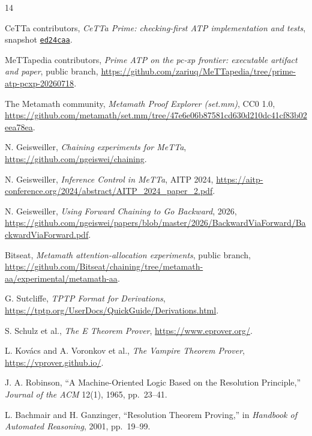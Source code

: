 \documentclass[10pt]{article}
\begin{document}
\begin{thebibliography}{14}

CeTTa contributors,
\emph{CeTTa Prime: checking-first ATP implementation and tests},
snapshot
\href{https://github.com/zariuq/CeTTa/tree/ed24caaa06ddc9e56afc06a33aea5fd6c8b046ea}
{\texttt{ed24caa}}.

MeTTapedia contributors,
\emph{Prime ATP on the pc-xp frontier: executable artifact and paper},
public branch,
\url{https://github.com/zariuq/MeTTapedia/tree/prime-atp-pcxp-20260718}.

The Metamath community,
\emph{Metamath Proof Explorer (set.mm)}, CC0 1.0,
\url{https://github.com/metamath/set.mm/tree/47e6e06b87581cd630d210dc41cf83b02eea78ea}.

N. Geisweiller,
\emph{Chaining experiments for MeTTa},
\url{https://github.com/ngeiswei/chaining}.

N. Geisweiller,
\emph{Inference Control in MeTTa}, AITP 2024,
\url{https://aitp-conference.org/2024/abstract/AITP_2024_paper_2.pdf}.

N. Geisweiller,
\emph{Using Forward Chaining to Go Backward}, 2026,
\url{https://github.com/ngeiswei/papers/blob/master/2026/BackwardViaForward/BackwardViaForward.pdf}.

Bitseat,
\emph{Metamath attention-allocation experiments}, public branch,
\url{https://github.com/Bitseat/chaining/tree/metamath-aa/experimental/metamath-aa}.

G. Sutcliffe,
\emph{TPTP Format for Derivations},
\url{https://tptp.org/UserDocs/QuickGuide/Derivations.html}.

S. Schulz et al.,
\emph{The E Theorem Prover},
\url{https://www.eprover.org/}.

L. Kov\'acs and A. Voronkov et al.,
\emph{The Vampire Theorem Prover},
\url{https://vprover.github.io/}.

J. A. Robinson,
``A Machine-Oriented Logic Based on the Resolution Principle,''
\emph{Journal of the ACM} 12(1), 1965, pp.~23--41.

L. Bachmair and H. Ganzinger,
``Resolution Theorem Proving,'' in
\emph{Handbook of Automated Reasoning}, 2001, pp.~19--99.

\end{thebibliography}
\end{document}
